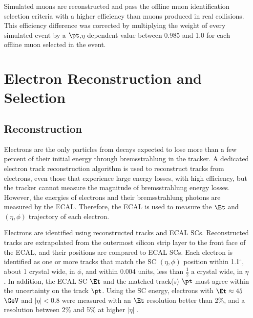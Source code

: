 Simulated muons are reconstructed and pass the offline muon identification selection criteria with a higher 
efficiency than muons produced in real collisions.  This efficiency difference was corrected by multiplying the weight of every 
simulated event by a $\pt$,$\eta$-dependent value between 0.985 and 1.0 for each offline muon selected in the event.


\section{Electron Reconstruction and Selection}
\label{sec:eleReco}

\subsection{Reconstruction}
Electrons are the only particles from \WR decays expected to lose more than a few percent of their initial energy through 
bremsstrahlung in the tracker.  A dedicated electron track reconstruction algorithm is used to reconstruct tracks from electrons, 
even those that experience large energy losses, with high efficiency, but the tracker cannot measure the magnitude of bremsstrahlung 
energy losses.  However, the energies of electrons and their bremsstrahlung photons are measured by the ECAL.  Therefore, the ECAL 
is used to measure the $\Et$ and $(\eta,\phi)$ trajectory of each electron.

Electrons are identified using reconstructed tracks and ECAL SCs.  Reconstructed tracks are extrapolated from the outermost 
silicon strip layer to the front face of the ECAL, and their positions are compared to ECAL SCs.  Each electron is identified 
as one or more tracks that match the SC $(\eta,\phi)$ position within 1.1$^{\circ}$, about 1 crystal wide, in $\phi$, and 
within 0.004 units, less than $\frac{1}{2}$ a crystal wide, in $\eta$.  In addition, the ECAL SC $\Et$ and the matched 
track(s) $\pt$ must agree within the uncertainty on the track $\pt$.  Using the SC energy, electrons with $\Et \approx 45$ 
$\GeV$ and $|\eta| < 0.8$ were measured with an $\Et$ resolution better than 2\%, and a resolution between 2\% and 5\% 
at higher $|\eta|$ \cite{ecalPerformanceInCollisions}.

